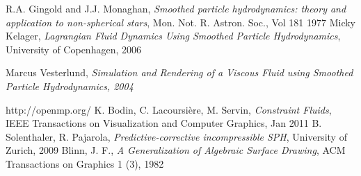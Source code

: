 \documentclass[a4paper,12pt,oneside,final]{extarticle}
\begin{document}
\begin{thebibliography}{9}
  
  R.A. Gingold and J.J. Monaghan, \emph{Smoothed particle hydrodynamics: theory and application to non-spherical stars}, Mon. Not. R. Astron. Soc., Vol 181 1977
  Micky Kelager, \emph{Lagrangian Fluid Dynamics Using Smoothed Particle Hydrodynamics}, University of Copenhagen, 2006

  Marcus Vesterlund, \emph{Simulation and Rendering of a Viscous Fluid using Smoothed Particle Hydrodynamics, 2004}
  
  http://openmp.org/
   K. Bodin, C. Lacoursière, M. Servin, \emph{Constraint Fluids}, IEEE Transactions on Visualization and Computer Graphics, Jan 2011 
    B. Solenthaler, R. Pajarola, \emph{Predictive-corrective incompressible SPH}, University of Zurich, 2009
    Blinn, J. F., \emph{A Generalization of Algebraic Surface Drawing}, ACM Transactions on Graphics 1 (3), 1982

\end{thebibliography}
\end{document}
